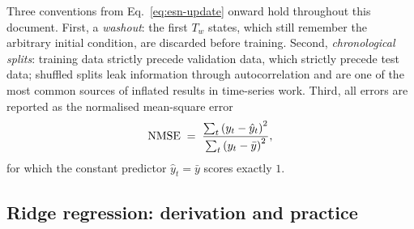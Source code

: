 Three conventions from Eq.~\eqref{eq:esn-update} onward hold throughout this
document. First, a \emph{washout}: the first $T_w$ states, which still remember
the arbitrary initial condition, are discarded before training. Second,
\emph{chronological splits}: training data strictly precede validation data,
which strictly precede test data; shuffled splits leak information through
autocorrelation and are one of the most common sources of inflated results in
time-series work. Third, all errors are reported as the normalised mean-square
error
\begin{equation}
  \mathrm{NMSE} \;=\; \frac{\sum_t \left(y_t - \hat y_t\right)^2}{\sum_t \left(y_t - \bar y\right)^2},
  \label{eq:nmse}
\end{equation}
for which the constant predictor $\hat y_t = \bar y$ scores exactly $1$.

\subsection{Ridge regression: derivation and practice}
\label{sec:ridge}

